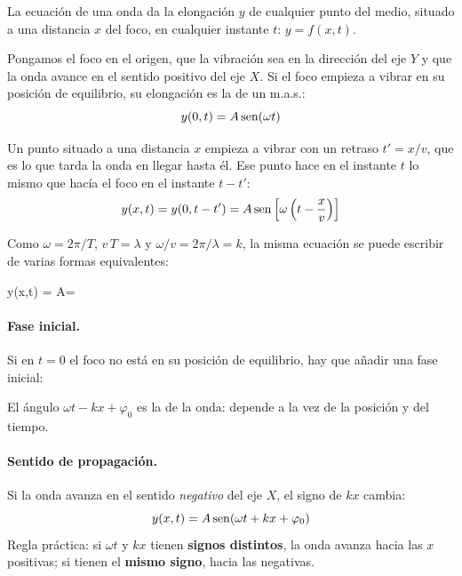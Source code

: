 La ecuación de una onda da la elongación \(y\) de cualquier punto del medio, situado a una distancia \(x\) del foco, en
cualquier instante \(t\): \(y = f(x, t)\).

Pongamos el foco en el origen, que la vibración sea en la dirección del eje \(Y\) y que la onda avance en el sentido positivo
del eje \(X\). Si el foco empieza a vibrar en su posición de equilibrio, su elongación es la de un m.a.s.:
\begin{equation*}
    y(0, t) = A\operatorname{sen}(\omega t)
\end{equation*}

Un punto situado a una distancia \(x\) empieza a vibrar con un retraso \(t' = x/v\), que es lo que tarda la onda en llegar
hasta él. Ese punto hace en el instante \(t\) lo mismo que hacía el foco en el instante \(t - t'\):
\begin{equation*}
    y(x, t) = y(0, t - t') = A\operatorname{sen}\left[\omega\left(t - \dfrac{x}{v}\right)\right]
\end{equation*}

Como \(\omega = 2\pi/T\), \(v\,T = \lambda\) y \(\omega/v = 2\pi/\lambda = k\), la misma ecuación se puede escribir de varias
formas equivalentes:
\begin{centeredequation}
    y(x,t) = A\sen{} =  \label{eq:ond-ecuacion}
\end{centeredequation}

\paragraph{Fase inicial.} Si en \(t = 0\) el foco no está en su posición de equilibrio, hay que añadir una fase inicial:
\begin{centeredequation}
     \label{eq:ond-ecuacion-fase}
\end{centeredequation}
El ángulo \(\omega t - kx + \varphi_0\) es la  de la onda: depende a la vez de la posición y del tiempo.

\paragraph{Sentido de propagación.} Si la onda avanza en el sentido \emph{negativo} del eje \(X\), el signo de \(kx\)
cambia:
\begin{equation*}
    y(x,t) = A\operatorname{sen}(\omega t + k x + \varphi_0)
\end{equation*}
Regla práctica: si \(\omega t\) y \(kx\) tienen \textbf{signos distintos}, la onda avanza hacia las \(x\) positivas; si
tienen el \textbf{mismo signo}, hacia las negativas.

